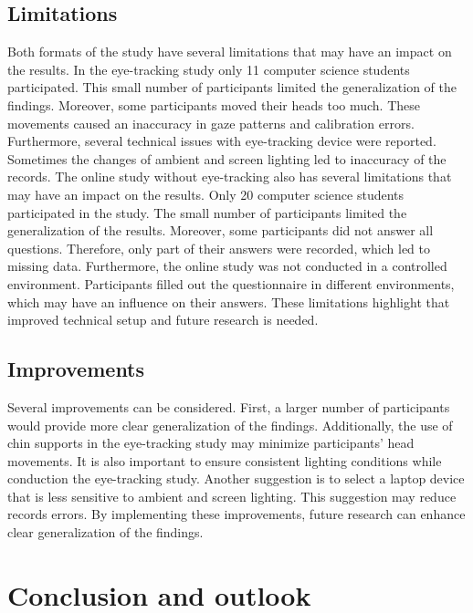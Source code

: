 \section{Limitations} 
Both formats of the study have several limitations that may have an impact on the results.
In the eye-tracking study only 11 computer science students participated.  This small number of participants limited the generalization of the findings.  Moreover, some participants moved their heads too much.  These movements caused an inaccuracy in gaze patterns and calibration errors. Furthermore, several technical issues with eye-tracking device were reported. Sometimes the changes of ambient and screen lighting led to inaccuracy of the records.
The online study without eye-tracking also has several limitations that may have an impact on the results. 
Only 20 computer science students participated in the study. The small number of participants limited the generalization of the results. 
Moreover, some participants did not answer all questions. Therefore, only part of their answers were recorded, which led to missing data. 
Furthermore, the online study was not conducted in a controlled environment. Participants filled out the questionnaire in different environments, which may have an influence on their answers.  
These limitations highlight that improved technical setup and future research is needed. 


\section{Improvements}

Several improvements can be considered. First, a larger number of participants would provide more clear generalization of the findings. Additionally, the use of chin supports in the eye-tracking study may minimize participants’ head movements. It is also important to ensure consistent lighting conditions while conduction the eye-tracking study. Another suggestion is to select a laptop device that is less sensitive to ambient and screen lighting. This suggestion may reduce records errors. By implementing these improvements, future research can enhance clear generalization of the findings. 

\chapter{Conclusion and outlook}
\label{sec:conclusion}

